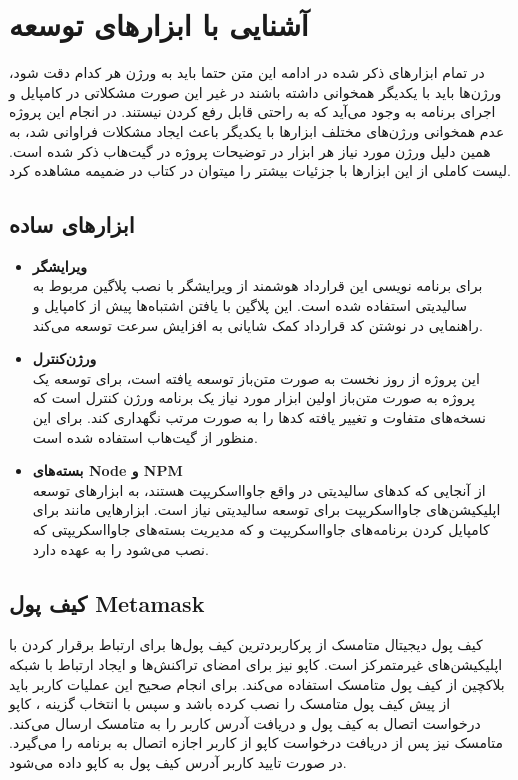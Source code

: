 \chapter{آشنایی با ابزار‌های توسعه}
در تمام ابزارهای ذکر شده در ادامه این متن حتما باید به ورژن هر کدام دقت شود،
ورژن‌ها باید با یکدیگر همخوانی داشته باشند در غیر این صورت مشکلاتی در
کامپایل و اجرای برنامه به وجود می‌آید که به راحتی قابل رفع کردن نیستند.
در انجام این پروژه عدم همخوانی ورژن‌های مختلف ابزارها با یکدیگر باعث ایجاد مشکلات فراوانی شد،
به همین دلیل ورژن مورد نیاز هر ابزار در توضیحات پروژه در گیت‌هاب ذکر شده است.
لیست کاملی از این ابزارها با جزئیات بیشتر را میتوان در کتاب
\cite{MasteringEthereum}
در ضمیمه
مشاهده کرد.

\section{ابزارهای ساده}
\begin{itemize}
	\item \textbf{ویرایشگر}\\
	برای برنامه نویسی این قرارداد هوشمند از ویرایشگر
	با نصب پلاگین مربوط به سالیدیتی
استفاده شده است.
این پلاگین با یافتن اشتباه‌ها پیش از کامپایل و راهنمایی در نوشتن کد قرارداد
کمک شایانی به افزایش سرعت توسعه می‌کند.

	\item \textbf{ورژن‌کنترل}\\
	این پروژه از روز نخست به صورت متن‌باز توسعه یافته است،
	برای توسعه یک پروژه به صورت متن‌باز اولین ابزار مورد نیاز یک برنامه ورژن کنترل است
	که نسخه‌های متفاوت و تغییر یافته کدها را به صورت مرتب نگهداری کند.
	برای این منظور از گیت‌هاب
	استفاده شده است.

	\item \textbf{بسته‌های Node و NPM}\\
از آنجایی که کدهای سالیدیتی در واقع جاوا‌اسکریپت هستند،
به ابزارهای توسعه اپلیکیشن‌های جاوااسکریپت برای توسعه سالیدیتی نیاز است. ابزارهایی مانند
برای کامپایل کردن برنامه‌های جاوااسکریپت و
که مدیریت بسته‌های جاوااسکریپتی که نصب می‌شود را به عهده دارد.

\end{itemize}


\section{کیف پول \gls{Metamask}}
کیف پول دیجیتال متامسک از پرکاربردترین کیف پول‌ها
برای ارتباط برقرار کردن با اپلیکیشن‌های غیرمتمرکز است.
کاپو نیز برای امضای تراکنش‌ها و ایجاد ارتباط با شبکه بلاکچین از کیف پول متامسک استفاده می‌کند.
برای انجام صحیح این عملیات کاربر باید از پیش کیف پول متامسک را نصب کرده باشد و سپس با انتخاب گزینه
،
کاپو درخواست اتصال به کیف پول و دریافت آدرس کاربر را به متامسک ارسال می‌کند.
متامسک نیز پس از دریافت درخواست کاپو از کاربر اجازه اتصال به برنامه را می‌گیرد.
در صورت تایید کاربر آدرس کیف پول به کاپو داده می‌شود.

